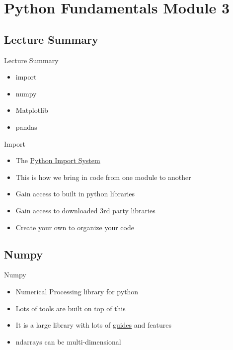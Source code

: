\section{Python Fundamentals Module 3}

\subsection{Lecture Summary}
\begin{Slide}{Lecture Summary}
  \begin{itemize}
  \item import
  \item numpy
  \item Matplotlib
  \item pandas
  \end{itemize}
\end{Slide}

% 
% 
% 
\begin{Slide}{Import}
  \begin{itemize}
  \item The \underline{\href{https://docs.python.org/3/reference/import.html}{Python Import System}}
  \item This is how we bring in code from one module to another
  \item Gain access to built in python libraries
  \item Gain access to downloaded 3rd party libraries
  \item Create your own to organize your code
  \end{itemize}
\end{Slide}

\subsection{Numpy}
% 
% 
% 
\begin{Slide}{Numpy}
  \begin{itemize}
  \item  Numerical Processing library for python
  \item Lots of tools are built on top of this
  \item It is a large library with lots of \underline{\href{ttps://numpy.org/learn/}{guides}} and features
  \item ndarrays can be multi-dimensional
  \end{itemize}
\end{Slide}

